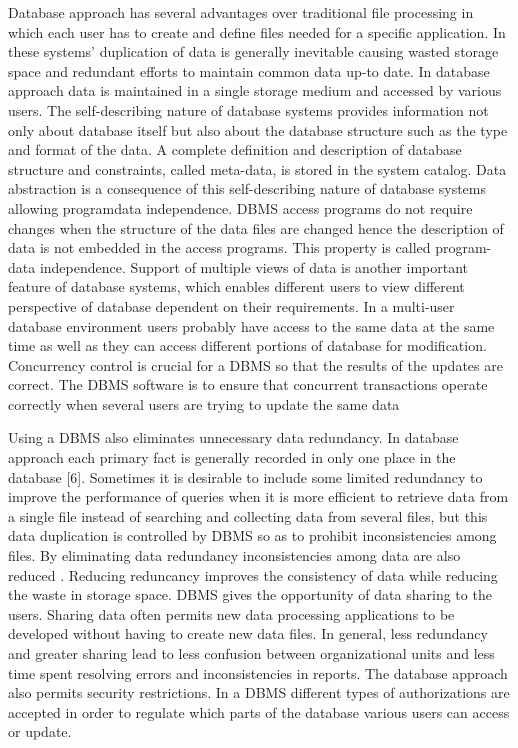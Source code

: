 Database approach has several advantages over traditional file processing
in which each user has to create and define files needed for a specific application.
In these systems' duplication of data is generally inevitable causing wasted storage
space and redundant efforts to maintain common data up-to date. In database
approach data is maintained in a single storage medium and accessed by various
users. The self-describing nature of database systems provides information not
only about database itself but also about the database structure such as the type and
format of the data. A complete definition and description of database structure and
constraints, called meta-data, is stored in the system catalog. Data abstraction is a
consequence of this self-describing nature of database systems allowing programdata independence. 
DBMS access programs do not require changes when the structure of the data files are changed hence 
the description of data is not embedded in the access programs. This property is called program-data
independence. Support of multiple views of data is another important feature of
database systems, which enables different users to view different perspective of
database dependent on their requirements. In a multi-user database environment
users probably have access to the same data at the same time as well as they can
access different portions of database for modification. Concurrency control is
crucial for a DBMS so that the results of the updates are correct. The DBMS
software is to ensure that concurrent transactions operate correctly when several
users are trying to update the same data

Using a DBMS also eliminates unnecessary data redundancy. In database
approach each primary fact is generally recorded in only one place in the database
[6]. Sometimes it is desirable to include some limited redundancy to improve the
performance of queries when it is more efficient to retrieve data from a single file
instead of searching and collecting data from several files, but this data duplication
is controlled by DBMS so as to prohibit inconsistencies among files. By
eliminating data redundancy inconsistencies among data are also reduced \cite{elmasri1998}.
Reducing reduncancy improves the consistency of data while reducing the waste
in storage space. DBMS gives the opportunity of data sharing to the users. Sharing
data often permits new data processing applications to be developed without
having to create new data files. In general, less redundancy and greater sharing
lead to less confusion between organizational units and less time spent resolving
errors and inconsistencies in reports. The database approach also permits security
restrictions. In a DBMS different types of authorizations are accepted in order to
regulate which parts of the database various users can access or update. 